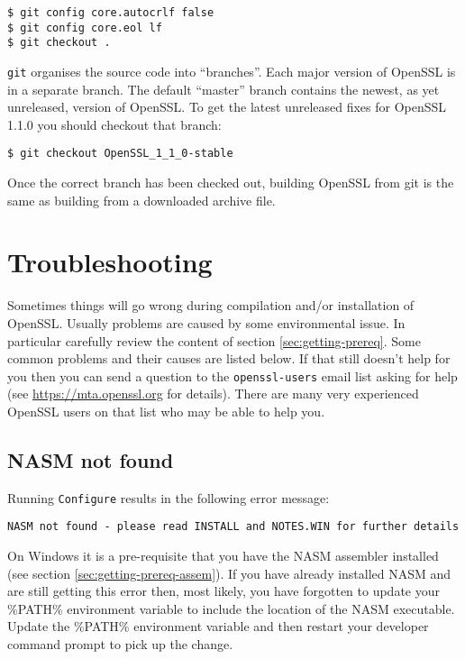 \begin{verbatim}
$ git config core.autocrlf false
$ git config core.eol lf
$ git checkout .
\end{verbatim}

\verb!git! organises the source code into ``branches''. Each major version of
OpenSSL is in a separate branch. The default ``master'' branch contains the
newest, as yet unreleased, version of OpenSSL. To get the latest unreleased
fixes for OpenSSL 1.1.0 you should checkout that branch:

\begin{verbatim}
$ git checkout OpenSSL_1_1_0-stable
\end{verbatim}

Once the correct branch has been checked out, building OpenSSL from git is the
same as building from a downloaded archive file.

\section{Troubleshooting}

Sometimes things will go wrong during compilation and/or installation of
OpenSSL. Usually problems are caused by some environmental issue. In particular
carefully review the content of section \ref{sec:getting-prereq}. Some common
problems and their causes are listed below. If that still doesn't help for you
then you can send a question to the \verb!openssl-users! email list asking for
help (see \url{https://mta.openssl.org} for details). There are many very
experienced OpenSSL users on that list who may be able to help you.

\subsection{NASM not found}

Running \verb!Configure! results in the following error message:

\begin{verbatim}
NASM not found - please read INSTALL and NOTES.WIN for further details
\end{verbatim}

On Windows it is a pre-requisite that you have the NASM assembler installed (see
section \ref{sec:getting-prereq-assem}). If you have already installed NASM and
are still getting this error then, most likely, you have forgotten to update
your \%PATH\% environment variable to include the location of the NASM
executable. Update the \%PATH\% environment variable and then restart your
developer command prompt to pick up the change.

